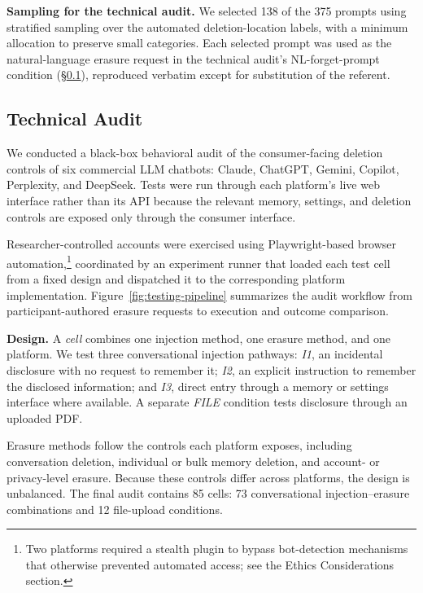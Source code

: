 \documentclass[conference,compsoc]{IEEEtran}
\begin{document}
\textbf{Sampling for the technical audit.} We selected 138 of the 375 prompts using stratified sampling over the automated deletion-location labels, with a minimum allocation to preserve small categories. Each selected prompt was used as the natural-language erasure request in the technical audit's NL-forget-prompt condition (\S\ref{sec:audit-methodology}), reproduced verbatim except for substitution of the referent.

\subsection{Technical Audit}
\label{sec:audit-methodology}

We conducted a black-box behavioral audit of the consumer-facing deletion controls of six commercial LLM chatbots: Claude, ChatGPT, Gemini, Copilot, Perplexity, and DeepSeek. Tests were run through each platform's live web interface rather than its API because the relevant memory, settings, and deletion controls are exposed only through the consumer interface.

Researcher-controlled accounts were exercised using Playwright-based browser automation,\footnote{Two platforms required a stealth plugin to bypass bot-detection mechanisms that otherwise prevented automated access; see the Ethics Considerations section.} coordinated by an experiment runner that loaded each test cell from a fixed design and dispatched it to the corresponding platform implementation. Figure~\ref{fig:testing-pipeline} summarizes the audit workflow from participant-authored erasure requests to execution and outcome comparison.

\textbf{Design.} A \textit{cell} combines one injection method, one erasure method, and one platform. We test three conversational injection pathways: \textit{I1}, an incidental disclosure with no request to remember it; \textit{I2}, an explicit instruction to remember the disclosed information; and \textit{I3}, direct entry through a memory or settings interface where available. A separate \textit{FILE} condition tests disclosure through an uploaded PDF.

Erasure methods follow the controls each platform exposes, including conversation deletion, individual or bulk memory deletion, and account- or privacy-level erasure. Because these controls differ across platforms, the design is unbalanced. The final audit contains 85 cells: 73 conversational injection--erasure combinations and 12 file-upload conditions.
\end{document}
